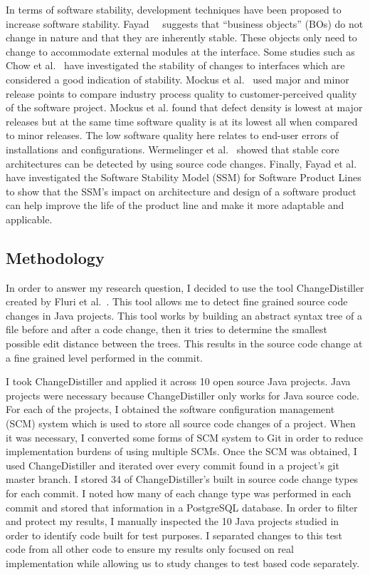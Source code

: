 In terms of software stability, development techniques have been proposed to increase software stability. 
Fayad~\cite{Fayad:2001:TOI}~\cite{Fayad:2002:ASS} suggests that ``business objects'' (BOs) do not change in nature and that they are inherently stable. These
objects only need to change to accommodate external modules at the interface. Some studies such as Chow et al.~\cite{Chow:2011:SJI} have investigated
the stability of changes to interfaces which are considered a good indication of stability.
Mockus et al.~\cite{Mockus:2008:IQR} used major and minor release points to compare industry process quality to customer-perceived quality of the software
project. Mockus et al. found that defect density is lowest at major releases but at the same time software quality is at its lowest all when compared to minor
releases. The low software quality here relates to end-user errors of installations and configurations. Wermelinger et al.~\cite{Wermelinger:2008:AEE}
showed that stable core architectures can be detected by using source code changes. Finally, Fayad et al.~\cite{Fayad:2010:SSM} have
investigated the Software Stability Model (SSM) for Software Product Lines to show that the SSM's impact on architecture and design of a software product
can help improve the life of the product line and make it more adaptable and applicable.

\subsection{Methodology}
\label{sec:apie-meth}
In order to answer my research question, I decided to use the tool ChangeDistiller created by Fluri et al.~\cite{Fluri:2007:CDT}. This tool allows me to detect fine grained
source code changes in Java projects. This tool works by building an abstract syntax tree of a file before and after a code change, then it tries to determine
the smallest possible edit distance between the trees. This results in the source code change at a fine grained level performed in the commit.

I took ChangeDistiller and applied it across 10 open source Java projects. Java projects were necessary because ChangeDistiller only works for Java source code.
For each of the projects, I obtained the software configuration management (SCM) system
which is used to store all source code changes of a project. When it was necessary, I converted some forms of SCM system to Git in order to reduce implementation
burdens of using multiple SCMs. Once the SCM was obtained, I used ChangeDistiller and iterated over every commit found in a project's git master branch. I stored
34 of ChangeDistiller's built in source code change types for each commit. I noted how many of each change type was performed in each commit and stored that information
in a PostgreSQL database. In order to filter and protect my results, I manually inspected the 10 Java projects studied in order to identify code built for test
purposes.
I separated changes to this test code from all other code to ensure my results only focused on real implementation while allowing us to study changes to
test based code separately.


